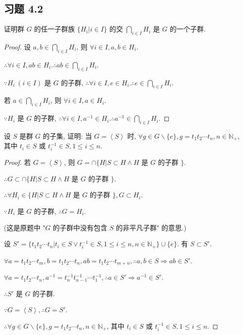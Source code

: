 \documentclass{ctexart}
\begin{document}
\subsection{习题 4.2}
\begin{exercise}[2.1]
    证明群 $G$ 的任一子群族 $\{H_i|i\in I\}$ 的交 $\bigcap\limits_{i\in I}H_i$ 是 $G$ 的一个子群.
\end{exercise}
\begin{proof}
    设 $a,b\in\bigcap\limits_{i\in I}H_i$, 则 $\forall i\in I,a,b\in H_i$.

    $\therefore\forall i\in I,ab\in H_i.\therefore ab\in\bigcap\limits_{i\in I}H_i$.

    $\because H_i\ (i\in I)$ 是 $G$ 的子群, $\therefore\forall i\in I,e\in H_i.\therefore e\in\bigcap\limits_{i\in I}H_i$.

    若 $a\in\bigcap\limits_{i\in I}H_i$, 则 $\forall i\in I,a\in H_i$.

    $\because H_i$ 是 $G$ 的子群, $\therefore\forall i\in I,a^{-1}\in H_i.\therefore a^{-1}\in\bigcap\limits_{i\in I}H_i$.
\end{proof}
\begin{exercise}[2.2]\label{ex2.2}
    设 $S$ 是群 $G$ 的子集, 证明: 当 $G=\left<S\right>$ 时, $\forall g\in G\backslash\{e\},g=t_1t_2\cdots t_n,n\in\mathbb{N}_+$, 其中 $t_i\in S$ 或 $t_i^{-1}\in S, 1\leq i\leq n$.
\end{exercise}
\begin{proof}
    若 $G=\left<S\right>$, 则 $G=\cap\{H|S\subset H\land H$ 是 $G$ 的子群 $\}$.

    $\therefore G\subset\cap\{H|S\subset H\land H$ 是 $G$ 的子群 $\}$.

    $\therefore\forall H_i\in\{H|S\subset H\land H$ 是 $G$ 的子群 $\},G\subset H_i$.

    $\because H_i$ 是 $G$ 的子群, $\therefore G=H_i$.

    (这是原题中 "$G$ 的子群中没有包含 $S$ 的非平凡子群" 的意思.)

    设 $S'=\{t_1t_2\cdots t_n|t_i\in S\vee t_i^{-1}\in S,1\leq i\leq n,n\in\mathbb{N}_+\}\cup\{e\}$. 有 $S\subset S'$.

    $\forall a=t_1t_2\cdots t_m,b=t_1t_2\cdots t_n,ab=t_1t_2\cdots t_{m+n},\therefore a,b\in S\Rightarrow ab\in S'$.

    $\forall a=t_1t_2\cdots t_n,a^{-1}=t_n^{-1}t_{n-1}^{-1}\cdots t_1^{-1},\therefore a\in S'\Rightarrow a^{-1}\in S'$.

    $\therefore S'$ 是 $G$ 的子群.

    $\because G=\left<S\right>,\therefore G=S'$.

    $\therefore\forall g\in G\backslash\{e\},g=t_1t_2\cdots t_n,n\in\mathbb{N}_+$, 其中 $t_i\in S$ 或 $t_i^{-1}\in S, 1\leq i\leq n$.
\end{proof}
\end{document}
